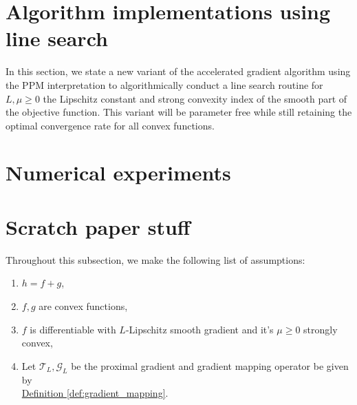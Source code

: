 \documentclass[12pt]{article}
\begin{document}
            


\section{Algorithm implementations using line search}\label{sec:algorithm_improved}
    In this section, we state a new variant of the accelerated gradient algorithm using the PPM interpretation to algorithmically conduct a line search routine for $L, \mu \ge 0$ the Lipschitz constant and strong convexity index of the smooth part of the objective function. 
    This variant will be parameter free while still retaining the optimal convergence rate for all convex functions. 
    

\section{Numerical experiments}\label{sec:numerical_experiments}

\appendix
\section{Scratch paper stuff}
    Throughout this subsection, we make the following list of assumptions: 
    \begin{enumerate}
        \item $h = f + g$, 
        \item $f, g$ are convex functions, 
        \item $f$ is differentiable with $L$-Lipschitz smooth gradient and it's $\mu \ge 0$ strongly convex,
        \item Let $\mathcal T_L, \mathcal G_L$ be the proximal gradient and gradient mapping operator be given by \\
        \hyperref[def:gradient_mapping]{Definition \ref*{def:gradient_mapping}}. 
    \end{enumerate}
\end{document}
